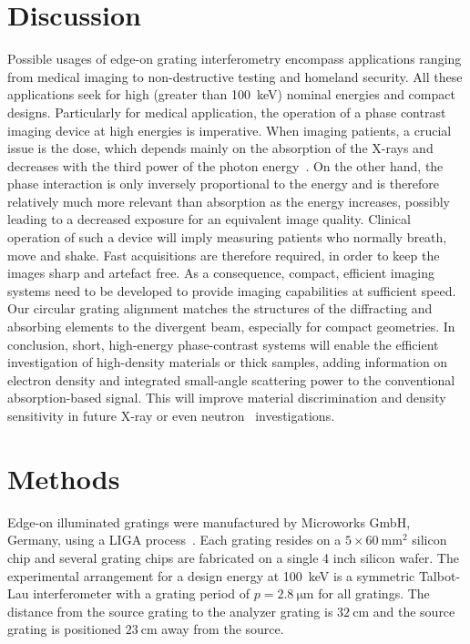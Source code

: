 \documentclass[english]{nature}
\begin{document}
\section*{Discussion}

Possible usages of edge-on grating interferometry encompass applications
ranging from medical imaging to non-destructive testing and homeland
security. All these applications seek for high (greater than
\SI{100}{\kilo\eV}) nominal energies
and compact designs. Particularly for medical application, the operation of
a phase contrast imaging device at high energies is imperative. When imaging
patients, a crucial issue is the dose, which depends mainly on the
absorption of the X-rays and decreases with the third power of the photon
energy~\cite{Momose2005}. On the other hand, the phase interaction is only inversely
proportional to the energy and is therefore relatively much more relevant
than absorption as the energy increases, possibly leading to a decreased
exposure for an equivalent image quality. Clinical operation of such a
device will imply measuring patients who normally breath, move and shake.
Fast acquisitions are therefore required, in order to keep the images sharp
and artefact free. As a consequence, compact, efficient imaging systems need
to be developed to provide imaging capabilities at sufficient speed. Our
circular grating alignment matches the structures of the diffracting and
absorbing elements to the divergent beam, especially for compact geometries.
In conclusion, short, high-energy phase-contrast systems will enable the
efficient investigation of high-density materials or thick samples, adding
information on electron density and integrated small-angle scattering power
to the conventional absorption-based signal. This will improve material
discrimination and density sensitivity in future X-ray or even
neutron~\cite{Grunzweig2008} investigations.

\section*{Methods}
Edge-on illuminated gratings were manufactured by Microworks GmbH, Germany, using a LIGA process~\cite{Kenntner2010}. Each grating
resides on a $5 \times \SI{60}{\milli\metre^2}$ silicon chip and several
grating chips are fabricated on a single 4 inch silicon wafer. The
experimental arrangement for a design energy at \SI{100}{\kilo\electronvolt}
is a symmetric Talbot-Lau interferometer with a grating period of $p =
\SI{2.8}{\micro \metre}$ for all gratings. The distance from the source
grating to the analyzer grating is $\SI{32}{\centi\metre}$ and the source
grating is positioned $\SI{23}{\centi\metre}$ away from the source.
\end{document}
